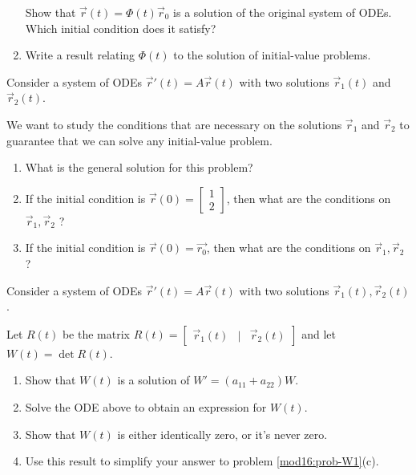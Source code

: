 \begin{exercises}
\begin{problist}
\begin{enumerate}
			Show that $\vec{r}(t) = \Phi(t) \vec{r}_0$ is a solution of the original system of ODEs. Which initial condition does it satisfy?
			
			\item Write a result relating $\Phi(t)$ to the solution of initial-value problems.
			\end{enumerate}

	
	
		\prob \label{mod16:prob-W1}Consider a system of ODEs $\vec{r}'(t) = A \vec{r}(t)$ with two solutions $\vec{r}_1(t)$ and $\vec{r}_2(t)$. 
		
		We want to study the conditions that are necessary on the solutions $\vec{r}_1$ and $\vec{r}_2$ to guarantee that we can solve any initial-value problem.
		
		\begin{enumerate}
			\item What is the general solution for this problem?
			\item If the initial condition is $\vec{r}(0)= \begin{bmatrix} 1 \\ 2 \end{bmatrix}$, then what are the conditions on $\vec{r}_1,\vec{r}_2$ ?
			\item If the initial condition is $\vec{r}(0)= \vec{r_0}$, then what are the conditions on $\vec{r}_1,\vec{r}_2$ ?
		\end{enumerate}

		\prob Consider a system of ODEs $\vec{r}'(t) = A \vec{r}(t)$ with two solutions $\vec{r}_1(t), \vec{r}_2(t)$.
		
			Let $R(t)$ be the matrix 
				$R(t) = \begin{bmatrix} \vec{r}_1(t) & | & \vec{r}_2(t)	\end{bmatrix} $ 
				and let $W(t) = \det R(t)$.
		
		\begin{enumerate}
			\item Show that $W(t)$ is a solution of $W' = (a_{11} + a_{22}) W$.
			\item Solve the ODE above to obtain an expression for $W(t)$.
			\item Show that $W(t)$ is either identically zero, or it's never zero. 
			\item Use this result to simplify your answer to problem \ref{mod16:prob-W1}(c).
		\end{enumerate}
	
	\end{problist}
\end{exercises}
